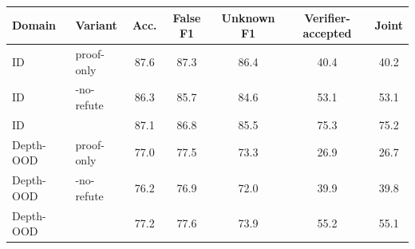 \begin{tabular}{llccccc}
\toprule
Domain & Variant & Acc. & False F1 & Unknown F1 & Verifier-accepted & Joint \\
\midrule
ID & proof-only & 87.6 & 87.3 & 86.4 & 40.4 & 40.2 \\
ID & \model{}-no-refute & 86.3 & 85.7 & 84.6 & 53.1 & 53.1 \\
ID & \model{} & 87.1 & 86.8 & 85.5 & 75.3 & 75.2 \\
\midrule
Depth-OOD & proof-only & 77.0 & 77.5 & 73.3 & 26.9 & 26.7 \\
Depth-OOD & \model{}-no-refute & 76.2 & 76.9 & 72.0 & 39.9 & 39.8 \\
Depth-OOD & \model{} & 77.2 & 77.6 & 73.9 & 55.2 & 55.1 \\
\bottomrule
\end{tabular}